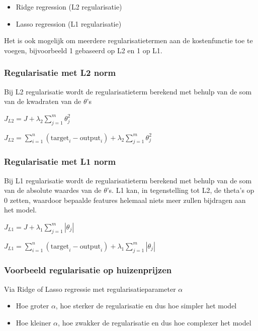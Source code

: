 \documentclass{article}
\begin{document}
\begin{itemize}
    \item Ridge regression (L2 regularisatie)
    \item Lasso regression (L1 regularisatie)
\end{itemize}

Het is ook mogelijk om meerdere regularisatietermen aan de kostenfunctie toe te voegen, 
bijvoorbeeld 1 gebaseerd op L2 en 1 op L1.

\subsubsection{Regularisatie met L2 norm}

Bij L2 regularisatie wordt de regularisatieterm berekend met behulp van de som 
van de kwadraten van de $\theta$'s 

\begin{center}
$J_{L2} = J + \lambda_2 \sum_{j=1}^m \theta_j^2$

$J_{L2} = \sum_{i=1}^n (\text{target}_i - \text{output}_i) + \lambda_2 \sum_{j=1}^m \theta_j^2$
\end{center}


\subsubsection{Regularisatie met L1 norm}

Bij L1 regularisatie wordt de regularisatieterm berekend met behulp van de som 
van de absolute waardes van de $\theta$'s. L1 kan, in tegenstelling tot L2, de theta's op 0 zetten, 
waardoor bepaalde features helemaal niets meer zullen bijdragen aan het model. 

\begin{center}
$J_{L1} = J + \lambda_1 \sum_{j=1}^m |\theta_j|$

$J_{L1} = \sum_{i=1}^n (\text{target}_i - \text{output}_i) + \lambda_1 \sum_{j=1}^m |\theta_j|$
\end{center}


\subsubsection{Voorbeeld regularisatie op huizenprijzen}

Via Ridge of Lasso regressie met regularisatieparameter $\alpha$

\begin{itemize}
    \item Hoe groter $\alpha$, hoe sterker de regularisatie en dus hoe simpler het model
    \item Hoe kleiner $\alpha$, hoe zwakker de regularisatie en dus hoe complexer het model
\end{itemize}
\end{document}
